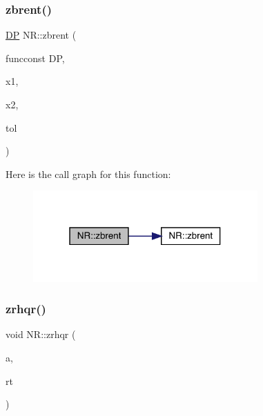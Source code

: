 \subsubsection{\texorpdfstring{zbrent()}{zbrent()}\hspace{0.1cm}{\footnotesize\ttfamily [2/2]}}
{\footnotesize\ttfamily \mbox{\hyperlink{namespaceNR_af6ff762dd605ff477b8e52387253a02a}{DP}} N\+R\+::zbrent (\begin{DoxyParamCaption}\item[{\mbox{\hyperlink{namespaceNR_af6ff762dd605ff477b8e52387253a02a}{DP}} }]{funcconst DP,  }\item[{const \mbox{\hyperlink{namespaceNR_af6ff762dd605ff477b8e52387253a02a}{DP}}}]{x1,  }\item[{const \mbox{\hyperlink{namespaceNR_af6ff762dd605ff477b8e52387253a02a}{DP}}}]{x2,  }\item[{const \mbox{\hyperlink{namespaceNR_af6ff762dd605ff477b8e52387253a02a}{DP}}}]{tol }\end{DoxyParamCaption})}

Here is the call graph for this function\+:
\nopagebreak
\begin{figure}[H]
\begin{center}
\leavevmode
\includegraphics[width=244pt]{da/d46/namespaceNR_a65e397db7c70abaac50b73cd18a8b8ae_cgraph}
\end{center}
\end{figure}
\mbox{\label{namespaceNR_a07f1329337e99d2666332950c702b2c7}} 
\subsubsection{\texorpdfstring{zrhqr()}{zrhqr()}}
{\footnotesize\ttfamily void N\+R\+::zrhqr (\begin{DoxyParamCaption}\item[{\mbox{\hyperlink{namespaceNR_a9f943da53862537c552e2a770cb170ae}{Vec\+\_\+\+I\+\_\+\+DP}} \&}]{a,  }\item[{\mbox{\hyperlink{namespaceNR_ace78d6fd6a189eda11ef1f1ec73692d9}{Vec\+\_\+\+O\+\_\+\+C\+P\+L\+X\+\_\+\+DP}} \&}]{rt }\end{DoxyParamCaption})}

